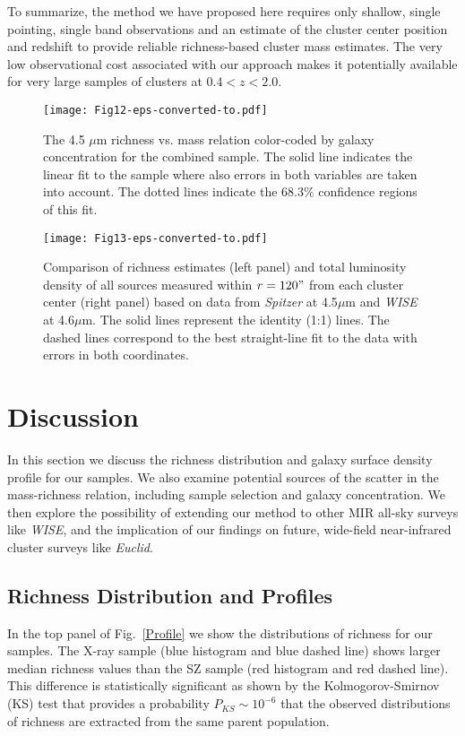 \documentclass[apj,twocolumn]{emulateapj}
\begin{document}
{To summarize, the method we have proposed here requires only shallow, single pointing, single  band observations and an estimate of the cluster center position and redshift to provide reliable richness-based cluster mass estimates. The very low observational cost associated with our approach  makes it potentially available for very large samples of clusters at $0.4 < z < 2.0$. 

\begin{figure}[t!]
\texttt{[image: Fig12-eps-converted-to.pdf]}
\caption{The 4.5 $\mu$m richness vs. mass relation color-coded by galaxy concentration for the combined sample. The solid line indicates the linear fit to the sample where also errors in both variables are taken into account. The dotted lines indicate the 68.3$\%$ confidence regions of this fit.}
\label{Concentration}
\end{figure}

\begin{figure*}[t!]
\texttt{[image: Fig13-eps-converted-to.pdf]}
\caption{Comparison of richness estimates (left panel) and total luminosity density of all sources measured within $r=120"$ from each cluster center (right panel) based on data from {\it Spitzer} at 4.5$\mu$m and {\it WISE} at 4.6$\mu$m. The solid lines represent the identity (1:1) lines. The dashed lines correspond to the best straight-line fit to the data with errors in both coordinates.}
\label{wise}
\end{figure*}

\section{Discussion}

In this section we discuss the richness distribution and galaxy surface density profile for our samples. We also examine potential sources of the scatter in the mass-richness relation, including sample selection and galaxy concentration. We then explore the possibility of extending our method  to other MIR all-sky surveys like {\it WISE}, and the implication of our findings on future, wide-field near-infrared cluster surveys like {\it Euclid}. 

\subsection{Richness Distribution and Profiles}

In the top panel of Fig.~\ref{Profile} we show the distributions of richness for our samples. The X-ray sample (blue histogram and blue dashed line) shows larger median richness values than the SZ sample  (red histogram and red dashed line). This difference is statistically significant as shown by the Kolmogorov-Smirnov (KS) test that provides a probability $P_{KS} \sim 10^{-6}$ that the observed distributions of richness are extracted from the same parent population. 

}
\end{document}
